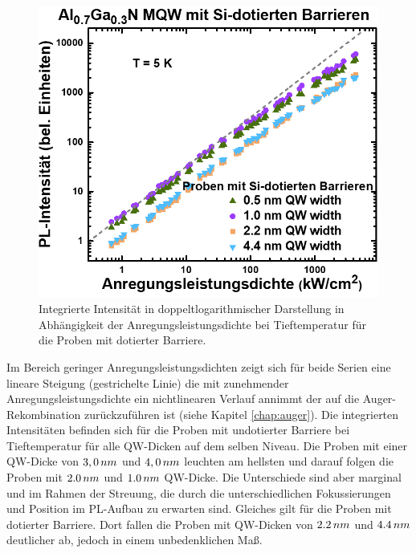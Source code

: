 \begin{figure}[H]
\begin{minipage}[t]{0.49\textwidth}
    \includegraphics[width=\linewidth]{Bilder/MQWdickenSerie/intTTdotierte.png}
		\caption{Integrierte Intensität in doppeltlogarithmischer Darstellung in Abhängigkeit der Anregungsleistungsdichte bei Tieftemperatur für die Proben mit dotierter Barriere.}
    \label{fig:dotiertint}
  \end{minipage}
\end{figure}
\noindent 
%
Im Bereich geringer Anregungsleistungsdichten zeigt sich für beide Serien eine lineare Steigung (gestrichelte Linie) die mit zunehmender Anregungsleistungsdichte ein nichtlinearen Verlauf annimmt der auf die Auger-Rekombination zurückzuführen ist (siehe Kapitel \ref{chap:auger}).
Die integrierten Intensitäten befinden sich für die Proben mit undotierter Barriere bei Tieftemperatur für alle QW-Dicken auf dem selben Niveau.
Die Proben mit einer QW-Dicke von $3,0 \thinspace nm$ und $4,0 \thinspace nm$ leuchten am hellsten und darauf folgen die Proben mit $2.0 \thinspace nm$ und $1.0 \thinspace nm$  QW-Dicke. Die Unterschiede sind aber marginal und im Rahmen der Streuung, die durch die unterschiedlichen Fokussierungen und Position im PL-Aufbau zu erwarten sind. Gleiches gilt für die Proben mit dotierter Barriere. Dort fallen die Proben mit QW-Dicken von $2.2 \thinspace nm$ und $4.4 \thinspace nm$ deutlicher ab, jedoch in einem unbedenklichen Maß.   
